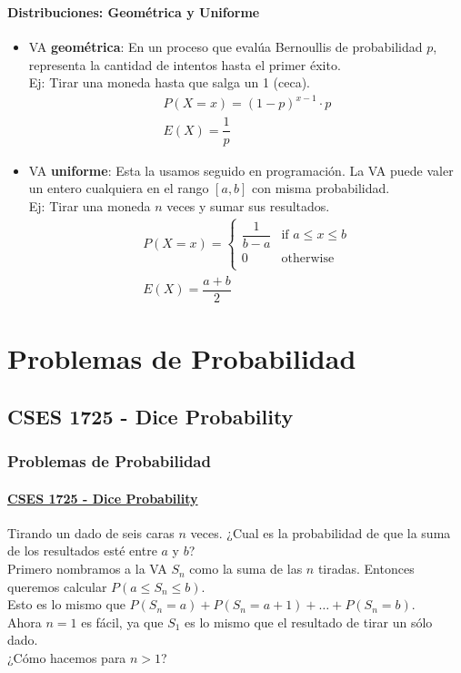 \documentclass{beamer}
\begin{document}
\begin{frame}
  \frametitle{\SECTIONA}
  \framesubtitle{Distribuciones: Geométrica y Uniforme}

  \begin{itemize}
    \item VA \textbf{geométrica}: En un proceso que evalúa Bernoullis de probabilidad \(p\), representa la cantidad de intentos hasta el primer éxito. \\
      Ej: Tirar una moneda hasta que salga un 1 (ceca).
      \begin{gather*}
        P(X = x) = (1 - p)^{x - 1} \cdot p \\
        E(X) = \dfrac{1}{p}
      \end{gather*}
    \item<2-> VA \textbf{uniforme}: Esta la usamos seguido en programación. La VA puede valer un entero cualquiera en el rango \([a, b]\) con misma probabilidad. \\
      Ej: Tirar una moneda \(n\) veces y sumar sus resultados.
      \begin{gather*}
        P(X = x) = \begin{cases} \dfrac{1}{b - a} & \text{if } a \leq x \leq b \\ 0 & \text{otherwise} \\ \end{cases} \\
        E(X) = \dfrac{a + b}{2}
      \end{gather*}
  \end{itemize}
\end{frame}

\newcommand{\SECTIONB}{Problemas de Probabilidad}
\section{\SECTIONB}

\subsection{CSES 1725 - Dice Probability}

\begin{frame}
  \frametitle{\SECTIONB}
  \framesubtitle{\href{https://cses.fi/problemset/task/1725/}{CSES 1725 - Dice Probability}}

  Tirando un dado de seis caras \(n\) veces. ¿Cual es la probabilidad de que la suma de los resultados esté entre \(a\) y \(b\)? \pause \\
  Primero nombramos a la VA \(S_{n}\) como la suma de las \(n\) tiradas. Entonces queremos calcular \(P(a \leq S_{n} \leq b)\). \pause \\
  Esto es lo mismo que \(P(S_{n} = a) + P(S_{n} = a+1) + \ldots + P(S_{n} = b)\). \pause \\
  Ahora \(n = 1\) es fácil, ya que \(S_{1}\) es lo mismo que el resultado de tirar un sólo dado. \\
  ¿Cómo hacemos para \(n > 1\)?

\end{frame}
\end{document}
